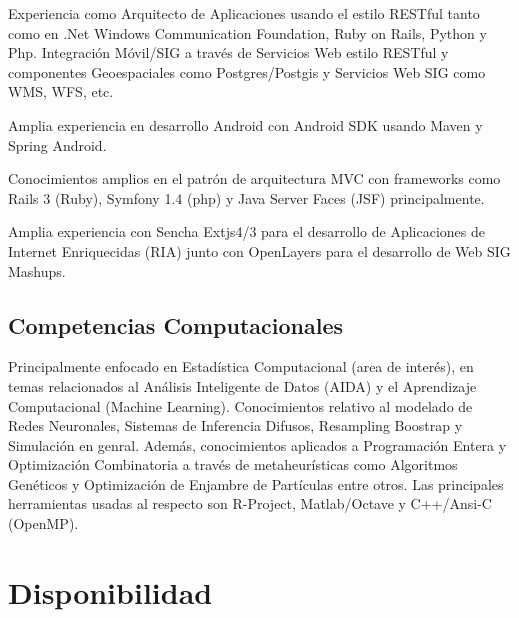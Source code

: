 \documentclass[11pt,letterpaper,roman]{moderncv}
\begin{document}
 {Experiencia como Arquitecto de
Aplicaciones usando el estilo RESTful tanto como en .Net Windows Communication
Foundation, Ruby on Rails, Python y Php. Integración Móvil/SIG a través de
Servicios Web estilo RESTful y componentes Geoespaciales como Postgres/Postgis y
Servicios Web SIG como WMS, WFS, etc.}
	

 {Amplia experiencia en desarrollo Android con Android
SDK usando Maven y Spring Android.}

 {Conocimientos amplios en el patrón de arquitectura
MVC con frameworks como Rails 3 (Ruby), Symfony 1.4 (php) y Java Server Faces
(JSF) principalmente.}


 {Amplia experiencia con Sencha Extjs4/3 para el
desarrollo de Aplicaciones de Internet Enriquecidas (RIA) junto con OpenLayers
para el desarrollo de Web SIG Mashups. }

\subsection{Competencias Computacionales}  {Principalmente enfocado en Estadística Computacional (area de
interés), en temas relacionados al Análisis Inteligente de Datos (AIDA) y el
Aprendizaje Computacional (Machine Learning). Conocimientos relativo al modelado
de Redes Neuronales, Sistemas de Inferencia Difusos, Resampling Boostrap y
Simulación en genral. Además, conocimientos aplicados a Programación Entera y
Optimización Combinatoria a través de metaheurísticas como Algoritmos Genéticos
y Optimización de Enjambre de Partículas entre otros. Las principales
herramientas usadas al respecto son R-Project, Matlab/Octave y C++/Ansi-C
(OpenMP).}

\section{Disponibilidad}  
\end{document}
